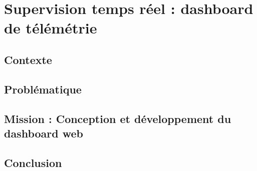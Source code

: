 \chapter{Supervision temps réel : dashboard de télémétrie}
\chapminitoc
\label{chap:dashboard}

\section{Contexte}

\section{Problématique}

\section{Mission : Conception et développement du dashboard web}
\objectif
\methodes
\resultats
\discussion

\section{Conclusion}
